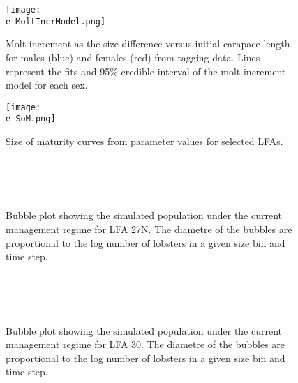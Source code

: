 \documentclass[11pt]{article}
\newcommand{\e}{\string~/bio.data/bio.lobster/figures/LFA2733Framework2018/} %
\begin{document}
    \begin{figure}
    \centering
        \texttt{[image: \\e MoltIncrModel.png]}
        \caption{Molt increment as the size difference versus initial carapace length for males (blue) and females (red) from tagging data. Lines represent the fits and 95\% credible interval of the molt increment model for each sex.}

    \end{figure}    

  
    \begin{figure}
    \centering
        \texttt{[image: \\e SoM.png]}
        \caption{Size of maturity curves from  parameter values for selected LFAs.}

    \end{figure}    

  



    

    \begin{figure}
    \centering
                \\
                \\
                \\
        
         \caption{Bubble plot showing the simulated population under the current management regime for LFA 27N. The diametre of the bubbles are proportional to the log number of lobsters in a given size bin and time step.}
    \end{figure}
    
    \begin{figure}
    \centering
                \\
                \\
                \\
        
         \caption{Bubble plot showing the simulated population under the current management regime for LFA 30. The diametre of the bubbles are proportional to the log number of lobsters in a given size bin and time step.}
    \end{figure}
    
\end{document}
